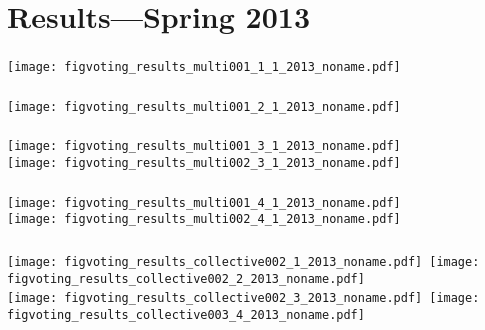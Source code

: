   

\section{Results---Spring 2013}


\begin{frame}[plain]
  \frametitle{}

  \texttt{[image: figvoting\_results\_multi001\_1\_1\_2013\_noname.pdf]}\\

\end{frame}

\begin{frame}[plain]
  \frametitle{}

  \texttt{[image: figvoting\_results\_multi001\_2\_1\_2013\_noname.pdf]}\\

\end{frame}

\begin{frame}[plain]
  \frametitle{}

  \texttt{[image: figvoting\_results\_multi001\_3\_1\_2013\_noname.pdf]}\\
  \texttt{[image: figvoting\_results\_multi002\_3\_1\_2013\_noname.pdf]}

\end{frame}

\begin{frame}[plain]
  \frametitle{}

  \texttt{[image: figvoting\_results\_multi001\_4\_1\_2013\_noname.pdf]}\\
  \texttt{[image: figvoting\_results\_multi002\_4\_1\_2013\_noname.pdf]}

\end{frame}


\begin{frame}[plain]
  \frametitle{}

  \texttt{[image: figvoting\_results\_collective002\_1\_2013\_noname.pdf]}~\texttt{[image: figvoting\_results\_collective002\_2\_2013\_noname.pdf]}\\
  \texttt{[image: figvoting\_results\_collective002\_3\_2013\_noname.pdf]}~\texttt{[image: figvoting\_results\_collective003\_4\_2013\_noname.pdf]}


\end{frame}


